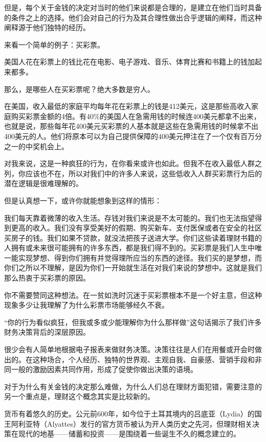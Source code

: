 但是，每个关于金钱的决定对当时的他们来说都是合理的，是建立在他们当时具备的条件之上的选择。他们会对自己的行为及其合理性做出合乎逻辑的阐释，而这种阐释源于他们独特的经历。

来看一个简单的例子：买彩票。

美国人花在彩票上的钱比花在电影、电子游戏、音乐、体育比赛和书籍上的钱加起来都多。

那么，是哪些人在买彩票呢？绝大多数是穷人。

在美国，收入最低的家庭平均每年花在彩票上的钱是412美元，这是那些高收入家庭购买彩票金额的4倍。有40\%的美国人在急需用钱的时候连400美元都拿不出来，也就是说，那些每年花400美元买彩票的人基本就是这些在急需用钱的时候拿不出400美元的人。他们将原本可以为自己提供保障的400美元押注在了一个仅有百万分之一的中奖机会上。

对我来说，这是一种疯狂的行为，在你看来或许也如此。但我不在收入最低人群之列，你应该也不在，所以对我们中的许多人来说，这些低收入人群买彩票行为后的潜在逻辑是很难理解的。

但是认真想一下，或许你就能想象到这样的情形：

{\kaishu

我们每天靠着微薄的收入生活。存钱对我们来说是不太可能的。我们也无法指望得到更高的收入。我们没有享受美好的假期、购买新车、支付医保或者在安全的社区买房子的钱。我们如果不贷款，就没法把孩子送进大学。你们这些读着理财书籍的人拥有或未来很可能拥有的许多东西，都是我们得不到的。买彩票是我们人生中唯一能实现梦想、得到你们拥有并觉得理所应当的东西的途径。我们买的是梦想，而你们之所以不理解，是因为你们一开始就生活在对我们来说的梦想中。这就是我们那么热衷于买彩票的原因。

}

你不需要赞同这种想法。在一贫如洗时沉迷于买彩票根本不是一个好主意，但这种现象多少让我理解了为什么彩票市场能够经久不衰。

“你的行为看似疯狂，但我或多或少能理解你为什么那样做”这句话揭示了我们许多财务决策背后的深层原因。

很少会有人简单地根据电子报表来做财务决策。决策往往是人们在用餐或开会时做出的。在这种场合，个人经历、独特的世界观、主观自我、自豪感、营销手段和非同一般的激励因素共同作用，形成了促使你做出决策的语境。

对于为什么有关金钱的决定那么难做，为什么人们总在理财方面犯错，需要注意的另一个重点是，理财这个概念其实是比较新的。

货币有着悠久的历史。公元前600年，如今位于土耳其境内的吕底亚（Lydia）的国王阿利亚特（Alyattes）发行的官方货币被认为开人类历史之先河，但理财相关决策在现代的地基——储蓄和投资——是围绕着一些诞生不久的概念建立的。

